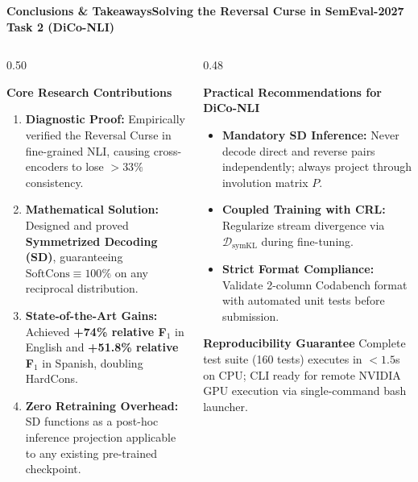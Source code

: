\documentclass[aspectratio=169,10pt]{beamer}
\begin{document}
\begin{frame}{\textbf{Conclusions \& Takeaways}}{\textbf{Solving the Reversal Curse in SemEval-2027 Task 2 (DiCo-NLI)}}
  \begin{columns}[T]
    \begin{column}{0.50\textwidth}
      \begin{block}{\textbf{Core Research Contributions}}
        \footnotesize
        \begin{enumerate}\setlength{\itemsep}{1pt}\setlength{\parskip}{0pt}
          \item \textbf{Diagnostic Proof:} Empirically verified the Reversal Curse in fine-grained NLI, causing cross-encoders to lose $>33\%$ consistency.
          \item \textbf{Mathematical Solution:} Designed and proved \textbf{Symmetrized Decoding (SD)}, guaranteeing $\text{SoftCons} \equiv 100\%$ on any reciprocal distribution.
          \item \textbf{State-of-the-Art Gains:} Achieved \textbf{+74\% relative F$_1$} in English and \textbf{+51.8\% relative F$_1$} in Spanish, doubling HardCons.
          \item \textbf{Zero Retraining Overhead:} SD functions as a post-hoc inference projection applicable to any existing pre-trained checkpoint.
        \end{enumerate}
      \end{block}
    \end{column}

    \begin{column}{0.48\textwidth}
      \begin{exampleblock}{\textbf{Practical Recommendations for DiCo-NLI}}
        \footnotesize
        \begin{itemize}\setlength{\itemsep}{1pt}\setlength{\parskip}{0pt}
          \item \textbf{Mandatory SD Inference:} Never decode direct and reverse pairs independently; always project through involution matrix $P$.
          \item \textbf{Coupled Training with CRL:} Regularize stream divergence via $\mathcal{D}_{\text{symKL}}$ during fine-tuning.
          \item \textbf{Strict Format Compliance:} Validate 2-column Codabench format with automated unit tests before submission.
        \end{itemize}
      \end{exampleblock}
      \vspace{0.05cm}
      \begin{block}{\textbf{Reproducibility Guarantee}}
        \footnotesize
        Complete test suite (160 tests) executes in $<1.5$s on CPU; CLI ready for remote NVIDIA GPU execution via single-command bash launcher.
      \end{block}
    \end{column}
  \end{columns}
\end{frame}
\end{document}
